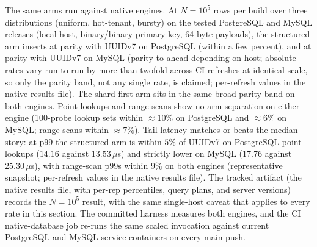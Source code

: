 \documentclass{svproc}
\begin{document}
The same arms run against native engines. At $N=10^5$ rows per build over three
distributions (uniform, hot-tenant, bursty) on the tested PostgreSQL and MySQL releases
(local host, binary/binary primary key,
64-byte payloads), the structured arm inserts at parity with UUIDv7 on PostgreSQL
(within a few percent), and at parity with UUIDv7 on MySQL (parity-to-ahead
depending on host; absolute rates vary run to run by more than twofold across CI
refreshes at identical scale, so only the parity band, not any single rate, is
claimed; per-refresh values in the native results file). The shard-first
arm sits in the same broad parity band on both engines. Point lookups and range scans show no
arm separation on either engine (100-probe lookup sets within $\approx 10\%$ on
PostgreSQL and $\approx 6\%$ on MySQL; range scans within $\approx 7\%$).
Tail latency matches or beats the median story: at p99 the structured arm is within $5\%$ of UUIDv7 on PostgreSQL point lookups ($14.16$ against $13.53\,\mu$s) and strictly lower on MySQL ($17.76$ against $25.30\,\mu$s), with range-scan p99s within $9\%$ on both engines (representative snapshot; per-refresh values in the native results file).
The tracked artifact
(the native results file, with per-rep percentiles, query plans, and
server versions) records the $N=10^5$ result, with the same single-host caveat that
applies to every rate in this section. The committed harness measures both engines, and
the CI native-database job re-runs the same scaled invocation against
current PostgreSQL and MySQL service containers on every main push.
\end{document}
